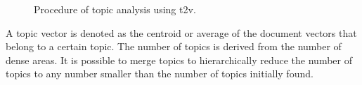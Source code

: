 \begin{figure}[!htp] %
    \centering
    
    \caption{Procedure of topic analysis using \acs*{t2v}.}
    \label{fig:top2vec}
\end{figure}

A topic vector is denoted as the centroid or average of the document vectors that belong to a certain topic.
The number of topics is derived from the number of dense areas.
It is possible to merge topics to hierarchically reduce the number of topics to any number smaller than the number of topics initially found.